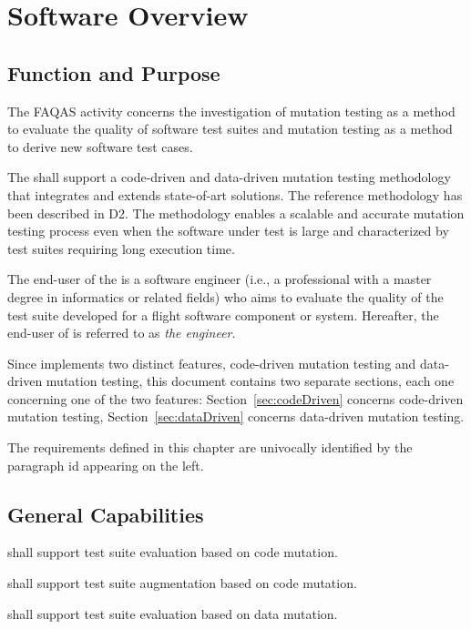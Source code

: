 
\chapter{Software Overview}
\label{chapter:overview}

\section{Function and Purpose}

The FAQAS activity concerns the investigation of mutation testing as a method to evaluate the quality of software test suites and mutation testing as a method to derive new software test cases.

The \FAQAS shall support a code-driven and data-driven mutation testing methodology that integrates and extends state-of-art solutions. The reference methodology has been described in D2. The methodology enables a scalable and accurate mutation testing process even when the software under test is large and characterized by test suites requiring long execution time.

The end-user of the \FAQAS is a software engineer (i.e., a professional with a master degree in informatics or related fields)  who aims to evaluate the quality of the test suite developed for a flight software component or system. Hereafter, the end-user of \FAQAS is referred to as \emph{the engineer}.

Since \FAQAS implements two distinct features, code-driven mutation testing and data-driven mutation testing, this document contains two separate sections, each one concerning one of the two features: Section~\ref{sec:codeDriven} concerns code-driven mutation testing, Section~\ref{sec:dataDriven} concerns data-driven mutation testing.

The requirements defined in this chapter are univocally identified by the paragraph id appearing on the left.

\section{General Capabilities}

\RQ{} \FAQAS shall support test suite evaluation based on code mutation.

\RQ{} \FAQAS shall support test suite augmentation based on code mutation.

\RQ{} \FAQAS shall support test suite evaluation based on data mutation.

